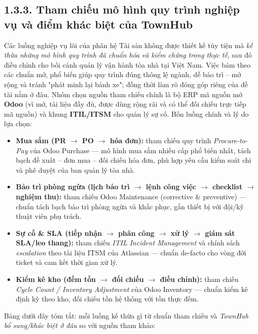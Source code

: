 \subsection*{1.3.3. Tham chiếu mô hình quy trình nghiệp vụ và điểm khác biệt của TownHub}
Các luồng nghiệp vụ lõi của phân hệ Tài sản không được thiết kế tùy tiện mà \emph{kế thừa những mô hình quy trình đã chuẩn hóa và kiểm chứng trong thực tế}, sau đó điều chỉnh cho bối cảnh quản lý vận hành tòa nhà tại Việt Nam. Việc bám theo các chuẩn mở, phổ biến giúp quy trình đúng thông lệ ngành, dễ bảo trì – mở rộng và tránh "phát minh lại bánh xe"; đồng thời làm rõ đóng góp riêng của đề tài nằm ở đâu. Nhóm chọn nguồn tham chiếu chính là bộ ERP mã nguồn mở \textbf{Odoo} (vì mở, tài liệu đầy đủ, được dùng rộng rãi và có thể đối chiếu trực tiếp mã nguồn) và khung \textbf{ITIL/ITSM} cho quản lý sự cố. Bốn luồng chính và lý do lựa chọn:
\begin{itemize}[leftmargin=1.4em,itemsep=1pt,topsep=2pt]
  \item \textbf{Mua sắm (PR $\rightarrow$ PO $\rightarrow$ hóa đơn):} tham chiếu quy trình \emph{Procure-to-Pay} của Odoo Purchase — mô hình mua sắm nhiều cấp phổ biến nhất, tách bạch đề xuất – đơn mua – đối chiếu hóa đơn, phù hợp yêu cầu kiểm soát chi và phê duyệt của ban quản lý tòa nhà.
  \item \textbf{Bảo trì phòng ngừa (lịch bảo trì $\rightarrow$ lệnh công việc $\rightarrow$ checklist $\rightarrow$ nghiệm thu):} tham chiếu Odoo Maintenance (corrective \& preventive) — chuẩn tách bạch bảo trì phòng ngừa và khắc phục, gắn thiết bị với đội/kỹ thuật viên phụ trách.
  \item \textbf{Sự cố \& SLA (tiếp nhận $\rightarrow$ phân công $\rightarrow$ xử lý $\rightarrow$ giám sát SLA/leo thang):} tham chiếu \emph{ITIL Incident Management} và chính sách \emph{escalation} theo tài liệu ITSM của Atlassian — chuẩn de-facto cho vòng đời ticket và cam kết thời gian xử lý.
  \item \textbf{Kiểm kê kho (đếm tồn $\rightarrow$ đối chiếu $\rightarrow$ điều chỉnh):} tham chiếu \emph{Cycle Count / Inventory Adjustment} của Odoo Inventory — chuẩn kiểm kê định kỳ theo kho, đối chiếu tồn hệ thống với tồn thực đếm.
\end{itemize}

Bảng dưới đây tóm tắt: mỗi luồng kế thừa gì từ chuẩn tham chiếu và \emph{TownHub bổ sung/khác biệt ở đâu} so với nguồn tham khảo:

